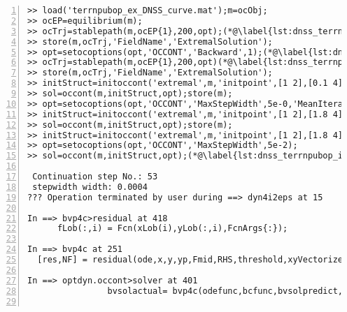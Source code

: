 \begin{lstlisting}[numbers=left]
>> load('terrnpubop_ex_DNSS_curve.mat');m=ocObj;
>> ocEP=equilibrium(m);
>> ocTrj=stablepath(m,ocEP{1},200,opt);(*@\label{lst:dnss_terrnpubop_weakDNSS1}@*)
>> store(m,ocTrj,'FieldName','ExtremalSolution');
>> opt=setocoptions(opt,'OCCONT','Backward',1);(*@\label{lst:dnss_terrnpubop_backward}@*)
>> ocTrj=stablepath(m,ocEP{1},200,opt)(*@\label{lst:dnss_terrnpubop_weakDNSS2}@*)
>> store(m,ocTrj,'FieldName','ExtremalSolution');
>> initStruct=initoccont('extremal',m,'initpoint',[1 2],[0.1 4],ocEP{2},'ContinuationType','f','IntegrationTime',1000);(*@\label{lst:dnss_terrnpubop_initoccont1}@*)
>> sol=occont(m,initStruct,opt);store(m);
>> opt=setocoptions(opt,'OCCONT','MaxStepWidth',5e-0,'MeanIteration',20);(*@\label{lst:dnss_terrnpubop_setocoptions1}@*)
>> initStruct=initoccont('extremal',m,'initpoint',[1 2],[1.8 4],sol,'ContinuationType','al');(*@\label{lst:dnss_terrnpubop_initoccont2}@*)
>> sol=occont(m,initStruct,opt);store(m);
>> initStruct=initoccont('extremal',m,'initpoint',[1 2],[1.8 4],ocEP{3},'ContinuationType','f','IntegrationTime',1000)
>> opt=setocoptions(opt,'OCCONT','MaxStepWidth',5e-2);
>> sol=occont(m,initStruct,opt);(*@\label{lst:dnss_terrnpubop_interrupt}@*)

 Continuation step No.: 53
 stepwidth width: 0.0004
??? Operation terminated by user during ==> dyn4i2eps at 15

In ==> bvp4c>residual at 418
      fLob(:,i) = Fcn(xLob(i),yLob(:,i),FcnArgs{:});

In ==> bvp4c at 251
  [res,NF] = residual(ode,x,y,yp,Fmid,RHS,threshold,xyVectorized,nBCs, ...

In ==> optdyn.occont>solver at 401
                bvsolactual= bvp4c(odefunc,bcfunc,bvsolpredict,opt.BVP);


\end{lstlisting}
